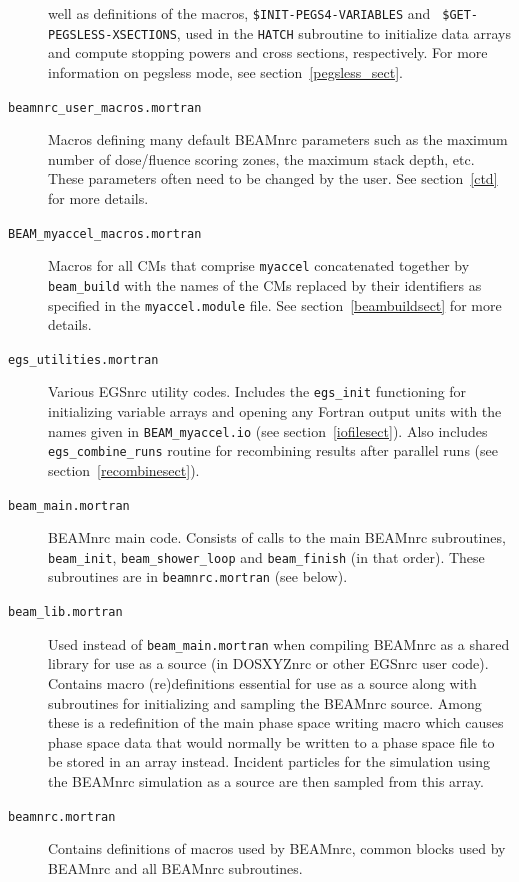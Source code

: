 \documentclass[12pt,twoside]{article}
\begin{document}
\begin{description}
well as definitions of the macros, {\tt \$INIT-PEGS4-VARIABLES} and {\tt
\$GET-PEGSLESS-XSECTIONS}, used in the {\tt HATCH} subroutine to initialize data
arrays and compute stopping powers and cross sections, respectively.  For more
information on pegsless mode, see section~\ref{pegsless_sect}.
\item[{\tt beamnrc\_user\_macros.mortran}] Macros defining many
default BEAMnrc parameters such as the maximum number of dose/fluence
scoring zones, the maximum stack depth, etc.  These parameters often need to be
changed by the user.  See section~\ref{ctd} for more details.
\item [{\tt BEAM\_myaccel\_macros.mortran}] Macros for all CMs that
comprise {\tt myaccel} concatenated together by {\tt beam\_build} with
the names of the CMs replaced by their identifiers as specified in
the {\tt myaccel.module} file.  See section~\ref{beambuildsect} for more details.
\item [{\tt egs\_utilities.mortran}]  Various EGSnrc utility codes.
Includes the {\tt egs\_init} functioning for initializing variable
arrays and opening any Fortran output units with the names given in
{\tt BEAM\_myaccel.io} (see section~\ref{iofilesect}).  Also includes
{\tt egs\_combine\_runs} routine for recombining results
after parallel runs (see section~\ref{recombinesect}).
\item [{\tt beam\_main.mortran}] BEAMnrc main code.  Consists
of calls to the main BEAMnrc subroutines,
{\tt beam\_init}, {\tt beam\_shower\_loop} and {\tt beam\_finish}
(in that order).  These subroutines are in {\tt beamnrc.mortran}
(see below).
\item [{\tt beam\_lib.mortran}] Used instead of {\tt beam\_main.mortran}
when compiling BEAMnrc as a shared library for use as a source
(in DOSXYZnrc or other EGSnrc user code).  Contains macro (re)definitions
essential for use as a source along with subroutines for initializing
and sampling the BEAMnrc source.  Among these is a redefinition of the
main phase space writing macro which causes phase space data that would
normally be written to a phase space file to be stored in an array instead.
Incident particles for the simulation
using the BEAMnrc simulation as a source are then sampled from this array.
\item [{\tt beamnrc.mortran}] Contains definitions of macros used by
BEAMnrc, common blocks used by BEAMnrc and all BEAMnrc subroutines.

\end{description}
\end{document}
